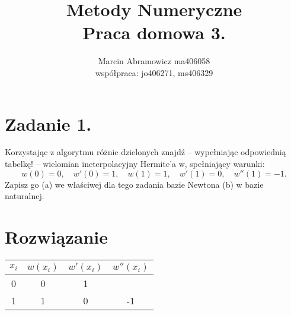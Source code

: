 \documentclass[a4paper]{article}
\title{\vspace{-1cm}
Metody Numeryczne \\
\large Praca domowa 3.
}
\author{
Marcin Abramowicz ma406058 \\
\small współpraca: jo406271, ms406329
}
\begin{document}
   \maketitle

   \section*{Zadanie 1.}

      Korzystając z algorytmu różnic dzielonych znajdź
      -- wypełniając odpowiednią tabelkę!
      -- wielomian ineterpolacyjny Hermite'a w, spełniający warunki:
      \[
         w(0) = 0, \quad w'(0) = 1, \quad w(1) = 1, \quad w'(1) = 0, \quad w''(1) = -1.
      \]
      Zapisz go (a) we właściwej dla tego zadania bazie Newtona (b) w bazie naturalnej.


   \section*{\large Rozwiązanie}

      \begin{center}
         \begin{tabular}{ | c | c | c | c | }
            \hline
            $x_{i}$ & $w(x_{i})$ & $w'(x_{i})$ & $w''(x_{i})$ \\
            \hline
            0 & 0 & 1 & \\
            \hline
            1 & 1 & 0 & -1 \\
            \hline
         \end{tabular}
      \end{center}
\end{document}
